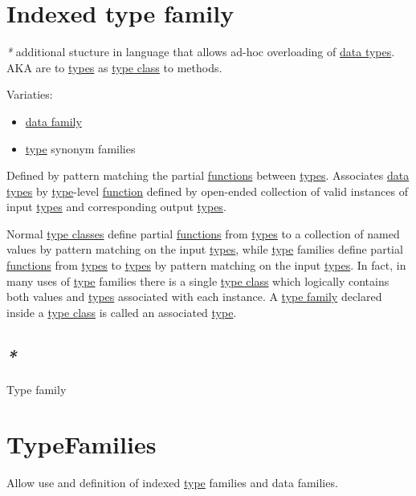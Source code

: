 \documentclass[a4paper,14pt,oneside]{book}
\begin{document}
\chapter{\label{org99a9cf5}Indexed type family}
\label{sec:org644ad45}
\emph{*} additional stucture in language that allows ad-hoc overloading of \hyperref[orgb916730]{data types}. AKA are to \hyperref[org90f7adb]{types} as \hyperref[org3c9b711]{type class} to methods.

Variaties:
\begin{itemize}
\item \hyperref[org3e40a0c]{data family}
\item \hyperref[org99e5c3b]{type} synonym families
\end{itemize}

Defined by pattern matching the partial \hyperref[org196c7cc]{functions} between \hyperref[org90f7adb]{types}.
Associates \hyperref[orgb916730]{data types} by \hyperref[org99e5c3b]{type}-level \hyperref[org1a6611b]{function} defined by open-ended collection of valid instances of input \hyperref[org90f7adb]{types} and corresponding output \hyperref[org90f7adb]{types}.

Normal \hyperref[org8141be4]{type classes} define partial \hyperref[org196c7cc]{functions} from \hyperref[org90f7adb]{types} to a collection of named values by pattern matching on the input \hyperref[org90f7adb]{types}, while \hyperref[org99e5c3b]{type} families define partial \hyperref[org196c7cc]{functions} from \hyperref[org90f7adb]{types} to \hyperref[org90f7adb]{types} by pattern matching on the input \hyperref[org90f7adb]{types}. In fact, in many uses of \hyperref[org99e5c3b]{type} families there is a single \hyperref[org3c9b711]{type class} which logically contains both values and \hyperref[org90f7adb]{types} associated with each instance. A \hyperref[orgffd86b5]{type family} declared inside a \hyperref[org3c9b711]{type class} is called an associated \hyperref[org99e5c3b]{type}.

\section{\emph{*}}
\label{sec:org26d1bf5}

\label{orgffd86b5}Type family

\chapter{\label{orgb081199}TypeFamilies}
\label{sec:orgbce3e36}
Allow use and definition of indexed \hyperref[org99e5c3b]{type} families and data families.
\end{document}
